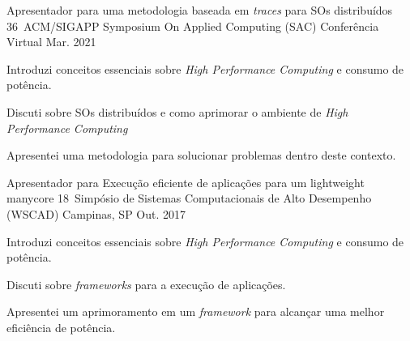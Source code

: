 

\begin{cventries}


  \cventry
    {Apresentador para uma metodologia baseada em \textit{traces} para SOs
    distribuídos} %
    {36\textordmasculine~ACM/SIGAPP Symposium On Applied Computing (SAC)} %
    {Conferência Virtual} %
    {Mar. 2021} %
    {
      \begin{cvitems} %
      \item {Introduzi conceitos essenciais sobre \textit{High Performance
        Computing} e consumo de potência.}
      \item {Discuti sobre SOs distribuídos e como aprimorar o ambiente de
        \textit{High Performance Computing}}
      \item {Apresentei uma metodologia para solucionar problemas dentro deste
          contexto.}
      \end{cvitems}
    }


  \cventry
    {Apresentador para Execução eficiente de aplicações para um lightweight
    manycore}
    {18\textordmasculine~Simpósio de Sistemas Computacionais de Alto Desempenho (WSCAD)} %
    {Campinas, SP} %
    {Out. 2017} %
    {
      \begin{cvitems} %
      \item {Introduzi conceitos essenciais sobre \textit{High Performance
        Computing} e consumo de potência.}
      \item {Discuti sobre \textit{frameworks} para a execução de aplicações.}
      \item {Apresentei um aprimoramento em um \textit{framework} para alcançar
        uma melhor eficiência de potência.}
      \end{cvitems}
    }



\end{cventries}
